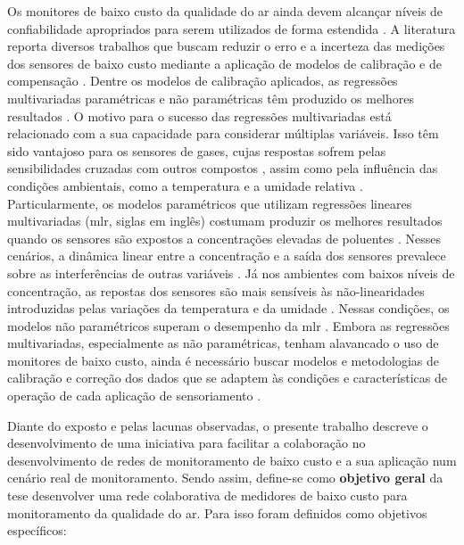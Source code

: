 Os monitores de baixo custo da qualidade do ar ainda devem alcançar níveis de confiabilidade apropriados para serem utilizados de forma estendida \cite{Penza2020Low-costMonitoring}. A literatura reporta diversos trabalhos que buscam reduzir o erro e a incerteza das medições dos sensores de baixo custo mediante a aplicação de modelos de calibração e de compensação \cite{Maag2018ADeployments, Concas2021LOW-COSTPREPRINT}. Dentre os modelos de calibração aplicados, as regressões multivariadas paramétricas e não paramétricas têm produzido os melhores resultados \cite{Feng2019ReviewTechnology,Concas2021LOW-COSTPREPRINT}. O motivo para o sucesso das regressões multivariadas está relacionado com a sua capacidade para considerar múltiplas variáveis. Isso têm sido vantajoso para os sensores de gases, cujas respostas sofrem pelas sensibilidades cruzadas com outros compostos \cite{Lewis2018Low-costApplications}, assim como pela influência das condições ambientais, como a temperatura \cite{Popoola2016DevelopmentStability} e a umidade relativa \cite{Pang2018TheMonitoring}. Particularmente, os modelos paramétricos que utilizam regressões lineares multivariadas (\gls{mlr}, siglas em inglês) \cite{Spinelle2015FieldDioxide} costumam produzir os melhores resultados quando os sensores são expostos a concentrações elevadas de poluentes \cite{Karagulian2019ReviewMonitoring}. Nesses cenários, a dinâmica linear entre a concentração e a saída dos sensores prevalece sobre as interferências de outras variáveis \cite{Hagan2018CalibrationInstruments}. Já nos ambientes com baixos níveis de concentração, as repostas dos sensores são mais sensíveis às não-linearidades introduzidas pelas variações da temperatura e da umidade \cite{Hagan2018CalibrationInstruments}. Nessas condições, os modelos não paramétricos superam o desempenho da \gls{mlr} \cite{Karagulian2019ReviewMonitoring}. Embora as regressões multivariadas, especialmente as não paramétricas, tenham alavancado o uso de monitores de baixo custo, ainda é necessário buscar modelos e metodologias de calibração e correção dos dados que se adaptem às condições e características de operação de cada aplicação de sensoriamento \cite{Concas2021LOW-COSTPREPRINT}.

Diante do exposto e pelas lacunas observadas, o presente trabalho descreve o desenvolvimento de uma iniciativa para facilitar a colaboração no desenvolvimento de redes de monitoramento de baixo custo e a sua aplicação num cenário real de monitoramento. Sendo assim, define-se como \textbf{objetivo geral} da tese desenvolver uma rede colaborativa de medidores de baixo custo para monitoramento da qualidade do ar. Para isso foram definidos como objetivos específicos:

